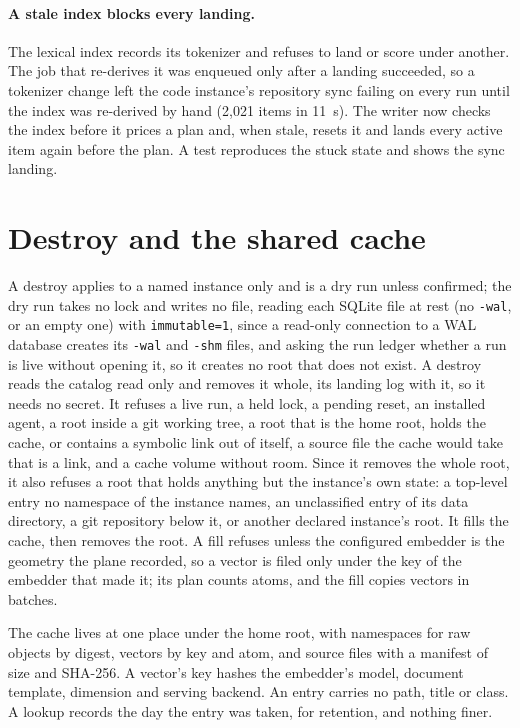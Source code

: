 \documentclass[11pt]{article}
\theoremstyle{plain}
\theoremstyle{definition}
\theoremstyle{remark}
\newcommand{\code}[1]{\texttt{#1}}
\begin{document}
\paragraph{A stale index blocks every landing.} The lexical index records its tokenizer and
refuses to land or score under another. The job that re-derives it was enqueued only after a landing
succeeded, so a tokenizer change left the code instance's repository sync failing on every run
until the index was re-derived by hand (2,021 items in 11~s). The writer now checks the index before
it prices a plan and, when stale, resets it and lands every active item again before the plan. A
test reproduces the stuck state and shows the sync landing.

\section{Destroy and the shared cache}\label{sec:destroy}

A destroy applies to a named instance only and is a dry run unless confirmed; the dry run takes no
lock and writes no file, reading each SQLite file at rest (no \code{-wal}, or an empty one) with
\code{immutable=1}, since a read-only connection to a WAL database creates its \code{-wal} and
\code{-shm} files, and asking the run ledger whether a run is live without opening it, so it
creates no root that does not exist. A destroy reads the catalog read only and removes it whole,
its landing log with it, so it needs no secret. It refuses a live run, a held lock, a pending
reset, an installed agent, a root inside a git working tree, a root that is the home root, holds the cache, or
contains a symbolic link out of itself, a source file the cache would take that is a link, and a
cache volume without room. Since it removes the whole root, it also refuses a root
that holds anything but the instance's own state: a top-level entry no namespace of the instance
names, an unclassified entry of its data directory, a git repository below it, or another declared
instance's root. It fills the cache, then removes the root. A fill refuses unless the configured
embedder is the geometry the plane recorded, so a vector is filed only under the key of the
embedder that made it; its plan counts atoms, and the fill copies vectors in batches.

The cache lives at one place under the home root, with namespaces for raw objects by digest, vectors
by key and atom, and source files with a manifest of size and SHA-256. A vector's key hashes the
embedder's model, document template, dimension and serving backend. An entry carries no path, title
or class. A lookup records the day the entry was taken, for retention, and nothing finer.
\end{document}
